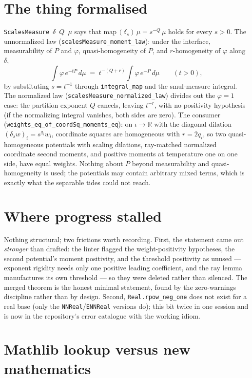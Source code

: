 \documentclass[11pt]{article}
\newcommand{\R}{\mathbb{R}}
\newcommand{\code}[1]{\texttt{#1}}
\begin{document}
\section{The thing formalised}

\code{ScalesMeasure}~$\delta$~$Q$~$\mu$ says that
$\mathrm{map}\,(\delta_s)\,\mu = s^{-Q}\,\mu$ holds for every
$s > 0$. The unnormalized law
(\code{scalesMeasure\_moment\_law}): under the interface,
measurability of $P$ and $\varphi$, quasi-homogeneity of $P$, and
$r$-homogeneity of $\varphi$ along $\delta$,
\[
  \int \varphi\, e^{-tP}\, d\mu
  \;=\; t^{-(Q + r)} \int \varphi\, e^{-P}\, d\mu
  \qquad (t > 0),
\]
by substituting $s = t^{-1}$ through \code{integral\_map} and the
smul-measure integral. The normalized law
(\code{scalesMeasure\_normalized\_law}) divides out the $\varphi = 1$
case: the partition exponent $Q$ cancels, leaving $t^{-r}$, with no
positivity hypothesis (if the normalizing integral vanishes, both
sides are zero). The consumer
(\code{weights\_eq\_of\_coordSq\_moments\_eq}): on $\iota \to \R$
with the diagonal dilation $(\delta_s w)_i = s^{q_i} w_i$, coordinate
squares are homogeneous with $r = 2q_i$, so two quasi-homogeneous
potentials with scaling dilations, ray-matched normalized coordinate
second moments, and positive moments at temperature one on one side,
have equal weights. Nothing about $P$ beyond measurability and
quasi-homogeneity is used; the potentials may contain arbitrary
mixed terms, which is exactly what the separable tides could not
reach.

\section{Where progress stalled}

Nothing structural; two frictions worth recording. First, the
statement came out \emph{stronger} than drafted: the linter flagged
the weight-positivity hypotheses, the second potential's moment
positivity, and the threshold positivity as unused --- exponent
rigidity needs only one positive leading coefficient, and the ray
lemma manufactures its own threshold --- so they were deleted rather
than silenced. The merged theorem is the honest minimal statement,
found by the zero-warnings discipline rather than by design. Second,
\code{Real.rpow\_neg\_one} does not exist for a real base (only the
\code{NNReal}/\code{ENNReal} versions do); this bit twice in one
session and is now in the repository's error catalogue with the
working idiom.

\section{Mathlib lookup versus new mathematics}
\end{document}
